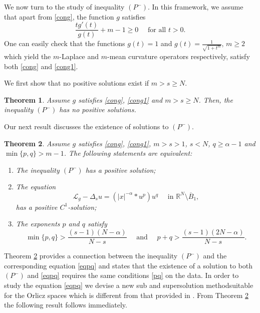 \documentclass[leqno,12pt]{article}
\numberwithin{equation}{section}
\newcommand{\R}{\mathbb R}
\newcommand{\Lg}{{\mathcal L}_g}
\newtheorem{theorem}{Theorem}[section]
\begin{document}
We now turn to the study of inequality $(P^-)$. In this framework, we assume that apart from \eqref{cong}, the function $g$ satisfies 
\begin{equation}\label{cong1}
\frac{tg'(t)}{g(t)}+m-1\geq 0 \quad\mbox{ for all }t>0.
\end{equation}
One can easily check that the functions $g(t)=1$ and $g(t)=\frac{1}{\sqrt{1+t^m}}$, $m\geq 2$ which yield the $m$-Laplace and $m$-mean curvature operators respectively, satisfy both \eqref{cong} and \eqref{cong1}.

We first show that no positive solutions exist if $m>s\geq N$. 
\begin{theorem}\label{tm1}
Assume $g$ satisfies \eqref{cong}, \eqref{cong1} and $m>s\geq N$. Then, the inequality $(P^-)$ has no positive solutions. 
\end{theorem}

Our next result discusses the existence of solutions to $(P^-)$. 

\begin{theorem}\label{tm2}
Assume $g$ satisfies \eqref{cong}, \eqref{cong1}, $m>s>1$, $s<N$, $q\geq \alpha-1$ and $\min\{p,q\}>m-1$. 
The following statements are equivalent:
\begin{enumerate}
\item[(i)] The inequality $(P^-)$ has a positive solution;
\item[(ii)] The equation 
\begin{equation}\label{eqpq}
\Lg-\Delta_s u=(|x|^{-\alpha}*u^p)u^q
\quad\mbox{ in }\R^N\setminus \overline B_1,
\end{equation}  
has a positive $C^1$-solution;
\item[(iii)] The exponents $p$ and $q$ satisfy
\begin{equation}\label{pq}
\min\{p, q\}>\frac{(s-1)(N-\alpha)}{N-s} \quad\mbox{ and }\quad p+q>\frac{(s-1)(2N-\alpha)}{N-s}.
\end{equation}
\end{enumerate}
\end{theorem}

Theorem \ref{tm2} provides a connection between the inequality $(P^-)$ and the corresponding equation \eqref{eqpq} and states that the existence of a solution to both $(P^-)$ and \eqref{eqpq} requires the same conditions \eqref{pq} on the data. In order to study the equation \eqref{eqpq} we devise a new sub and supersolution methodsuitable for the Orlicz spaces which is different from that provided in \cite{F18}. From Theorem \ref{tm2} the following result follows immediately.
\end{document}
